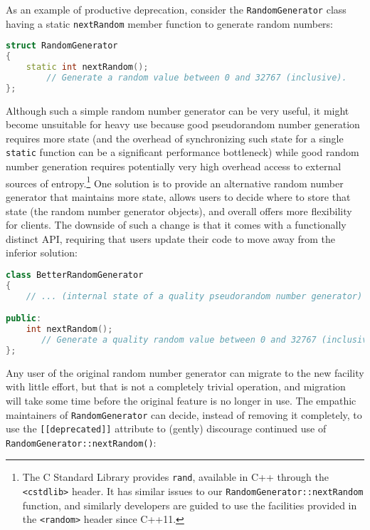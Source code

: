 As an example of productive deprecation, consider the
\texttt{RandomGenerator} class having a static \texttt{nextRandom}
member function to generate random numbers:

\begin{lstlisting}[language=C++]
struct RandomGenerator
{
    static int nextRandom();
        // Generate a random value between 0 and 32767 (inclusive).
};
\end{lstlisting}
    
\noindent Although such a simple random number generator can be very useful, it
might become unsuitable for heavy use because good pseudorandom number
generation requires more state (and the overhead of synchronizing such
state for a single \texttt{static} function can be a significant
performance bottleneck) while good random number generation requires
potentially very high overhead access to external sources of
entropy.{\cprotect\footnote{The C Standard Library provides
\texttt{rand}, available in C++ through the \texttt{<cstdlib>} header.
It has similar issues to our \texttt{RandomGenerator::nextRandom}
function, and similarly developers are guided to use the facilities
  provided in the \texttt{<random>} header since C++11.}} One
solution is to provide an alternative random number generator that
maintains more state, allows users to decide where to store that state
(the random number generator objects), and overall offers more
flexibility for clients. The downside of such a change is that it comes
with a functionally distinct API, requiring that users update their code
to move away from the inferior solution:

\begin{lstlisting}[language=C++]
class BetterRandomGenerator
{
    // ... (internal state of a quality pseudorandom number generator) ...

public:
    int nextRandom();
       // Generate a quality random value between 0 and 32767 (inclusive).
};
\end{lstlisting}
    
\noindent Any user of the original random number generator can migrate to the new
facility with little effort, but that is not a completely trivial
operation, and migration will take some time before the original feature is no
longer in use. The empathic maintainers of \texttt{RandomGenerator} can
decide, instead of removing it completely, to use the
\texttt{[[deprecated]]} attribute to (gently) discourage continued use
of \texttt{RandomGenerator::nextRandom()}:

